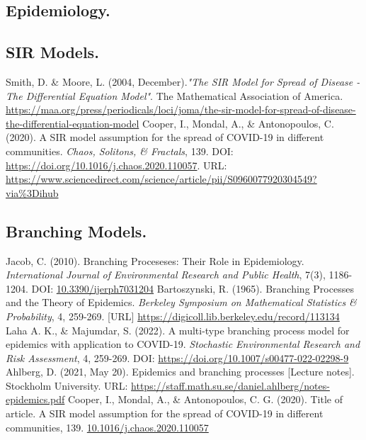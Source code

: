 \documentclass[11pt]{article}
\begin{document}
\begin{thebibliography}{100}
    \section*{\textbf{Epidemiology.}}
    \subsection*{SIR Models.}
     Smith, D. \& Moore, L. (2004, December).\emph{"The SIR Model for Spread of Disease - The Differential Equation Model"}. The Mathematical Association of America. \url{https://maa.org/press/periodicals/loci/joma/the-sir-model-for-spread-of-disease-the-differential-equation-model}
     Cooper, I., Mondal, A., \& Antonopoulos, C. (2020). A SIR model assumption for the spread of COVID-19 in different communities. \emph{Chaos, Solitons, \& Fractals}, 139. DOI: \url{https://doi.org/10.1016/j.chaos.2020.110057}. URL: \url{https://www.sciencedirect.com/science/article/pii/S0960077920304549?via%3Dihub}

    \subsection*{Branching Models.}
     Jacob, C. (2010). Branching Proceseses: Their Role in Epidemiology. \emph{International Journal of Environmental Research and Public Health}, 7(3), 1186-1204. DOI: \url{10.3390/ijerph7031204}
     Bartoszynski, R. (1965). Branching Processes and the Theory of Epidemics. \emph{Berkeley Symposium on Mathematical Statistics \& Probability}, 4, 259-269. [URL] \url{https://digicoll.lib.berkeley.edu/record/113134}
     Laha A. K., \& Majumdar, S. (2022). 
    A multi-type branching process model for epidemics with application to COVID-19.
    \emph{Stochastic Environmental Research and Risk Assessment}, 4, 259-269. 
    DOI: \url{https://doi.org/10.1007/s00477-022-02298-9}
     Ahlberg, D. (2021, May 20). Epidemics and branching processes [Lecture notes]. Stockholm University. URL: \url{https://staff.math.su.se/daniel.ahlberg/notes-epidemics.pdf}
     Cooper, I., Mondal, A., \& Antonopoulos, C. G. (2020). Title of article. A SIR model assumption for the spread of COVID-19 in different communities, 139. \url{ 10.1016/j.chaos.2020.110057}

\end{thebibliography}
\end{document}
